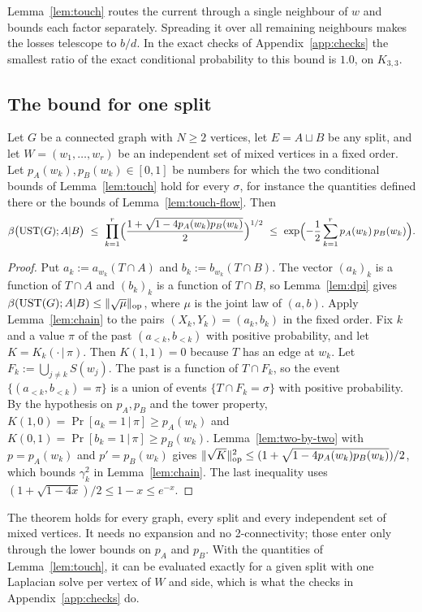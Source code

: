 Lemma~\ref{lem:touch} routes the current through a single neighbour of $w$ and bounds each factor separately. Spreading it over all remaining neighbours makes the losses telescope to $b/d$. In the exact checks of Appendix~\ref{app:checks} the smallest ratio of the exact conditional probability to this bound is $1.0$, on $K_{3,3}$.

\subsection{The bound for one split}

\begin{theorem}\label{thm:touch-cut}
Let $G$ be a connected graph with $N\ge2$ vertices, let $E=A\sqcup B$ be any split, and let $W=(w_1,\dots,w_r)$ be an independent set of mixed vertices in a fixed order. Let $p_A(w_k),p_B(w_k)\in[0,1]$ be numbers for which the two conditional bounds of Lemma~\ref{lem:touch} hold for every $\sigma$, for instance the quantities defined there or the bounds of Lemma~\ref{lem:touch-flow}. Then
\[
  \beta\bigl(\UST(G);A|B\bigr)\ \le\ \prod_{k=1}^r\Bigl(\frac{1+\sqrt{1-4p_A(w_k)p_B(w_k)}}2\Bigr)^{1/2}\ \le\ \exp\Bigl(-\frac12\sum_{k=1}^rp_A(w_k)\,p_B(w_k)\Bigr).
\]
\end{theorem}

\begin{proof}
Put $a_k:=a_{w_k}(T\cap A)$ and $b_k:=b_{w_k}(T\cap B)$. The vector $(a_k)_k$ is a function of $T\cap A$ and $(b_k)_k$ is a function of $T\cap B$, so Lemma~\ref{lem:dpi} gives $\beta(\mathrm{UST}(G);A|B)\le\lVert \sqrt\mu\rVert_{\mathrm{op}}$, where $\mu$ is the joint law of $(a,b)$. Apply Lemma~\ref{lem:chain} to the pairs $(X_k,Y_k)=(a_k,b_k)$ in the fixed order. Fix $k$ and a value $\pi$ of the past $(a_{<k},b_{<k})$ with positive probability, and let $K=K_k(\cdot\,|\,\pi)$. Then $K(1,1)=0$ because $T$ has an edge at $w_k$. Let $F_k:=\bigcup_{j\ne k}S(w_j)$. The past is a function of $T\cap F_k$, so the event $\{(a_{<k},b_{<k})=\pi\}$ is a union of events $\{T\cap F_k=\sigma\}$ with positive probability. By the hypothesis on $p_A,p_B$ and the tower property, $K(1,0)=\Pr[a_k=1\,|\,\pi]\ge p_A(w_k)$ and $K(0,1)=\Pr[b_k=1\,|\,\pi]\ge p_B(w_k)$. Lemma~\ref{lem:two-by-two} with $p=p_A(w_k)$ and $p'=p_B(w_k)$ gives $\lVert \sqrt K\rVert_{\mathrm{op}}^2\le(1+\sqrt{1-4p_A(w_k)p_B(w_k)})/2$, which bounds $\gamma_k^2$ in Lemma~\ref{lem:chain}. The last inequality uses $(1+\sqrt{1-4x})/2\le1-x\le e^{-x}$.
\end{proof}

The theorem holds for every graph, every split and every independent set of mixed vertices. It needs no expansion and no 2-connectivity; those enter only through the lower bounds on $p_A$ and $p_B$. With the quantities of Lemma~\ref{lem:touch}, it can be evaluated exactly for a given split with one Laplacian solve per vertex of $W$ and side, which is what the checks in Appendix~\ref{app:checks} do.

